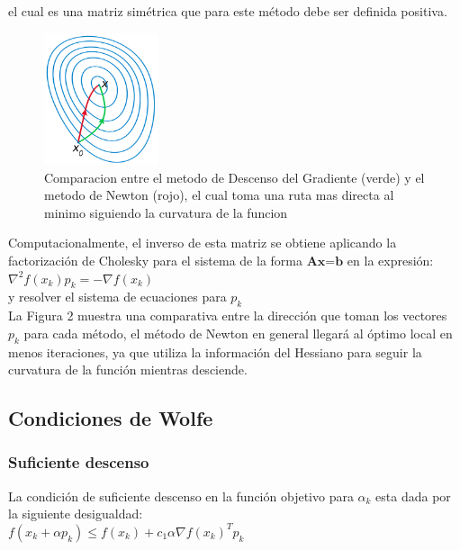 \documentclass[10pt,journal,compsoc]{styles/IEEEtran}
\begin{document}
el cual es una matriz sim\'etrica que para este m\'etodo debe ser definida positiva.\\

\begin{figure}[hbtp]
\centering
\includegraphics[width=0.3\textwidth]{newton.png}
\caption{Comparacion entre el metodo de Descenso del Gradiente (verde) y el metodo de Newton (rojo), el cual toma una ruta mas directa al minimo siguiendo la curvatura de la funcion}
\end{figure}

Computacionalmente, el inverso de esta matriz se obtiene aplicando la factorizaci\'on de Cholesky para el sistema de la forma $\textbf{Ax=b}$ en la expresi\'on:\\

$\nabla^{2}f(x_k) p_k=-\nabla f(x_k)$\\

y resolver el sistema de ecuaciones para $p_k$\\

La Figura 2 muestra una comparativa entre la direcci\'on que toman los vectores $p_k$ para cada m\'etodo, el m\'etodo de Newton en general llegar\'a al \'optimo local en menos iteraciones, ya que utiliza la informaci\'on del Hessiano para seguir la curvatura de la funci\'on mientras desciende.\\

\subsection{Condiciones de Wolfe}

\subsubsection{Suficiente descenso}

La condici\'on de suficiente descenso en la funci\'on objetivo para $\alpha_k$ esta dada por la siguiente desigualdad:\\

$f(x_k+\alpha p_k) \leq f(x_k)+c_1 \alpha \nabla f(x_k)^T p_k$\\
\end{document}

